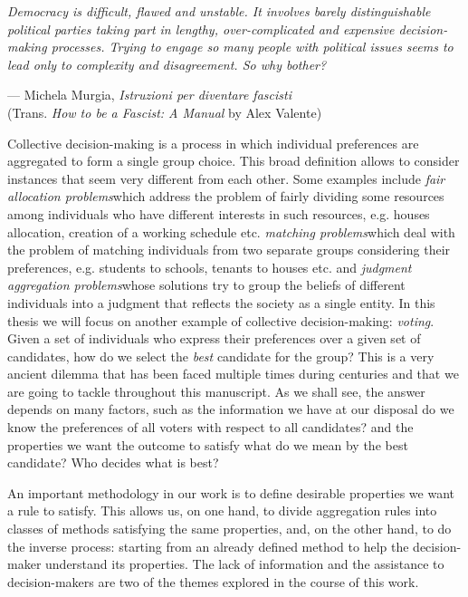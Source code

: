 \setlength{}
\setlength\epigraphrule{0pt}
\renewcommand{\textflush}{flushepinormal}
\epigraph{\itshape Democracy is difficult, flawed and unstable. It involves barely distinguishable political parties taking part in lengthy, over-complicated and expensive decision-making processes. Trying to engage so many people with political issues seems to lead only to complexity and disagreement. So why bother?}{--- Michela Murgia, \textit{Istruzioni per diventare fascisti}\\ \scriptsize{(Trans. \textit{How to be a Fascist: A Manual} by Alex Valente)}}


Collective decision-making is a process in which individual preferences are aggregated to form a single group choice. This broad definition allows to consider instances that seem very different from each other.
Some examples include \textit{fair allocation problems}\textemdash which address the problem of fairly dividing some resources among individuals who have different interests in such resources, e.g. houses allocation, creation of a working schedule etc.\textemdash 
\textit{matching problems}\textemdash which deal with the problem of matching individuals from two separate groups considering their preferences, e.g. students to schools, tenants to houses etc.\textemdash 
and \textit{judgment aggregation problems}\textemdash whose solutions try to group the beliefs of different individuals into a judgment that reflects the society as a single entity.
In this thesis we will focus on another example of collective decision-making: \textit{voting}. Given a set of individuals who express their preferences over a given set of candidates, how do we select the \textit{best} candidate for the group? This is a very ancient dilemma that has been faced multiple times during centuries and that we are going to tackle throughout this manuscript.
As we shall see, the answer depends on many factors, such as the information we have at our disposal \textemdash do we know the preferences of all voters with respect to all candidates? \textemdash and the properties we want the outcome to satisfy \textemdash what do we mean by the best candidate? Who decides what is best?

An important methodology in our work is to define desirable properties we want a rule to satisfy. This allows us, on one hand, to divide aggregation rules into classes of methods satisfying the same properties, and, on the other hand, to do the inverse process: starting from an already defined method to help the decision-maker understand its properties.
The lack of information and the assistance to decision-makers are two of the themes explored in the course of this work.

